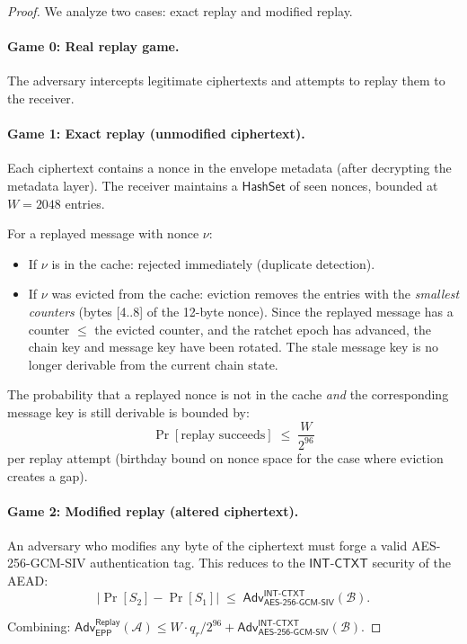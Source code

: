 \documentclass[11pt,a4paper]{article}
\theoremstyle{definition}
\theoremstyle{remark}
\newcommand{\adv}{\mathsf{Adv}}
\newcommand{\advA}{\mathcal{A}}
\newcommand{\advB}{\mathcal{B}}
\newcommand{\AEAD}{\mathsf{AES\text{-}256\text{-}GCM\text{-}SIV}}
\newcommand{\INTCTXT}{\mathsf{INT\text{-}CTXT}}
\begin{document}
\begin{proof}
We analyze two cases: exact replay and modified replay.

\paragraph{Game 0: Real replay game.}
The adversary intercepts legitimate ciphertexts and attempts to replay them
to the receiver.

\paragraph{Game 1: Exact replay (unmodified ciphertext).}
Each ciphertext contains a nonce in the envelope metadata (after decrypting
the metadata layer).  The receiver maintains a $\mathsf{HashSet}$ of seen
nonces, bounded at $W = 2048$ entries.

For a replayed message with nonce $\nu$:
\begin{itemize}[nosep]
  \item If $\nu$ is in the cache: rejected immediately (duplicate detection).
  \item If $\nu$ was evicted from the cache: eviction removes the entries
        with the \emph{smallest counters} (bytes [4..8] of the 12-byte nonce).
        Since the replayed message has a counter $\leq$ the evicted counter,
        and the ratchet epoch has advanced, the chain key and message key have
        been rotated.  The stale message key is no longer derivable from the
        current chain state.
\end{itemize}

The probability that a replayed nonce is not in the cache \emph{and} the
corresponding message key is still derivable is bounded by:
\[
  \Pr[\text{replay succeeds}] \;\leq\; \frac{W}{2^{96}}
\]
per replay attempt (birthday bound on nonce space for the case where eviction
creates a gap).

\paragraph{Game 2: Modified replay (altered ciphertext).}
An adversary who modifies any byte of the ciphertext must forge a valid
AES-256-GCM-SIV authentication tag.  This reduces to the $\INTCTXT$
security of the AEAD:
\[
  |\Pr[S_2] - \Pr[S_1]| \;\leq\; \adv^{\INTCTXT}_{\AEAD}(\advB).
\]

Combining: $\adv^{\mathsf{Replay}}_{\mathsf{EPP}}(\advA) \leq
W \cdot q_r / 2^{96} + \adv^{\INTCTXT}_{\AEAD}(\advB)$. \qedhere
\end{proof}
\end{document}
